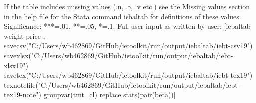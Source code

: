 If the table includes missing values (.n, .o, .v etc.) see the Missing values section in the help file for the Stata command iebaltab for definitions of these values. Significance: ***=.01, **=.05, *=.1. Full user input as written by user: [iebaltab weight price , savecsv("C:/Users/wb462869/GitHub/ietoolkit/run/output/iebaltab/iebt-csv19") savexlsx("C:/Users/wb462869/GitHub/ietoolkit/run/output/iebaltab/iebt-xlsx19") savetex("C:/Users/wb462869/GitHub/ietoolkit/run/output/iebaltab/iebt-tex19") texnotefile("C:/Users/wb462869/GitHub/ietoolkit/run/output/iebaltab/iebt-tex19-note") groupvar(tmt\_cl) replace stats(pair(beta))] 
